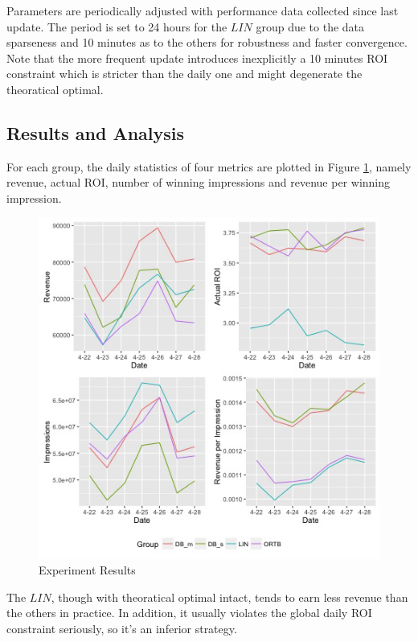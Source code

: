 \documentclass[sigconf]{acmart}
\begin{document}
Parameters are periodically adjusted with performance data collected since last update.
The period is set to 24 hours for the $LIN$ group due to the data sparseness
    and 10 minutes as to the others for robustness and faster convergence.
Note that the more frequent update introduces inexplicitly a 10 minutes ROI constraint
    which is stricter than the daily one and might degenerate the theoratical optimal.

\subsection{Results and Analysis}

For each group, the daily statistics of four metrics are plotted in Figure \ref{Result},
    namely revenue, actual ROI, number of winning impressions and revenue per winning impression.

\begin{figure}[!h]
\centering
\includegraphics[width=1.0\linewidth]{./Result.jpg}
\caption{Experiment Results\label{Result}}
\end{figure}

The $LIN$, though with theoratical optimal intact, tends to earn less revenue than the others in practice.
In addition, it usually violates the global daily ROI constraint seriously, so it's an inferior strategy.
\end{document}
